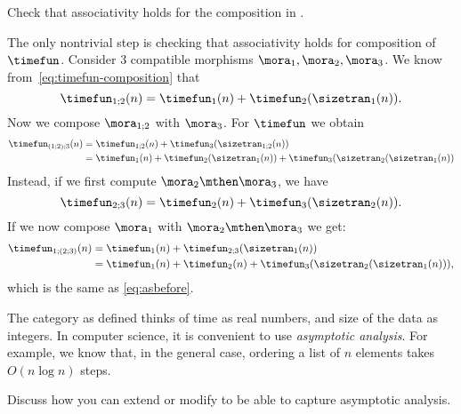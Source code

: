 \begin{exercise}
    Check that associativity holds for the composition in \ProcSizeTime.
\end{exercise}
\begin{solution}
    The only nontrivial step is checking that associativity holds for composition of~$\timefun$.
    Consider 3 compatible morphisms $\mora_1,\mora_2,\mora_3$.
    We know from~\cref{eq:timefun-composition} that
    \begin{equation}
        \timefun_{1;2} (n) = \timefun_1(n) + \timefun_2(\sizetran_1(n)).
    \end{equation}
    Now we compose $\mora_{1;2}$ with $\mora_3$.
    For $\timefun$ we obtain
    \begin{align}
        \timefun_{(1;2);3}(n) & =  \timefun_{1;2}(n) + \timefun_3(\sizetran_{1;2}(n)) \\
                              & =  \timefun_1(n)
        + \timefun_2(\sizetran_1(n))
        + \timefun_3(\sizetran_2(\sizetran_1(n)) \label{eq:asbefore}
    \end{align}
    Instead, if we first compute $\mora_2\mthen\mora_3$, we have
    \begin{equation}
        \timefun_{2;3} (n) = \timefun_2(n) + \timefun_3(\sizetran_2(n)).
    \end{equation}
    If we now compose $\mora_1$ with $\mora_2\mthen\mora_3$ we get:
    \begin{align}
        \timefun_{1;(2;3)} (n) & = \timefun_1(n) + \timefun_{2;3}(\sizetran_1(n))                           \\
                               & = \timefun_1(n) + \timefun_2(n) + \timefun_3(\sizetran_2(\sizetran_1(n))),
    \end{align}
    which is the same as \cref{eq:asbefore}.
\end{solution}


\vfill
\begin{gradedexercise}
    The category \ProcSizeTime as defined thinks of time as real numbers, and size of the data as integers.
    In computer science, it is convenient to use \emph{asymptotic analysis}.
    For example, we know that, in the general case, ordering a list of $n$ elements takes $O(n \log n)$ steps.

    Discuss how you can extend or modify \ProcSizeTime to be able to capture asymptotic analysis.
\end{gradedexercise}


